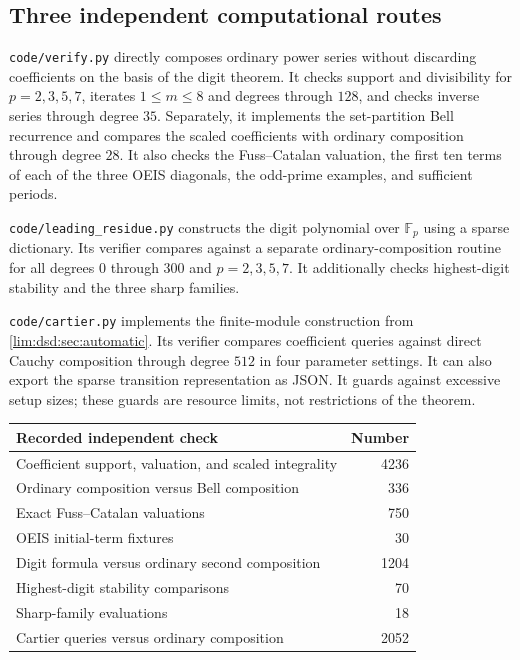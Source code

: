 \documentclass[11pt]{article}
\theoremstyle{definition}
\theoremstyle{remark}
\newcommand{\Fp}{\mathbb F_p}
\begin{document}
\subsection{Three independent computational routes}

\texttt{code/verify.py} directly composes ordinary power series
without discarding coefficients on the basis of the digit theorem.
It checks support and divisibility for $p=2,3,5,7$, iterates
$1\le m\le8$ and degrees through $128$, and checks inverse
series through degree $35$. Separately, it implements the
set-partition Bell recurrence and compares the scaled coefficients
with ordinary composition through degree $28$. It also checks
the Fuss--Catalan valuation, the first ten terms of each of the
three OEIS diagonals, the odd-prime examples, and sufficient periods.

\texttt{code/leading\_residue.py} constructs the digit polynomial
over $\Fp$ using a sparse dictionary. Its verifier compares against
a separate ordinary-composition routine for all degrees $0$ through
$300$ and $p=2,3,5,7$. It additionally checks highest-digit stability
and the three sharp families.

\texttt{code/cartier.py} implements the finite-module construction
from \cref{lim:dsd:sec:automatic}. Its verifier compares coefficient queries
against direct Cauchy composition through degree $512$ in four
parameter settings. It can also export the sparse transition
representation as JSON. It guards against excessive setup sizes;
these guards are resource limits, not restrictions of the theorem.

\begin{center}
\small
\begin{tabular}{@{}L{0.57\textwidth}r@{}}
\toprule
Recorded independent check & Number\\
\midrule
Coefficient support, valuation, and scaled integrality & 4236\\
Ordinary composition versus Bell composition & 336\\
Exact Fuss--Catalan valuations & 750\\
OEIS initial-term fixtures & 30\\
Digit formula versus ordinary second composition & 1204\\
Highest-digit stability comparisons & 70\\
Sharp-family evaluations & 18\\
Cartier queries versus ordinary composition & 2052\\
\bottomrule
\end{tabular}
\end{center}
\end{document}
